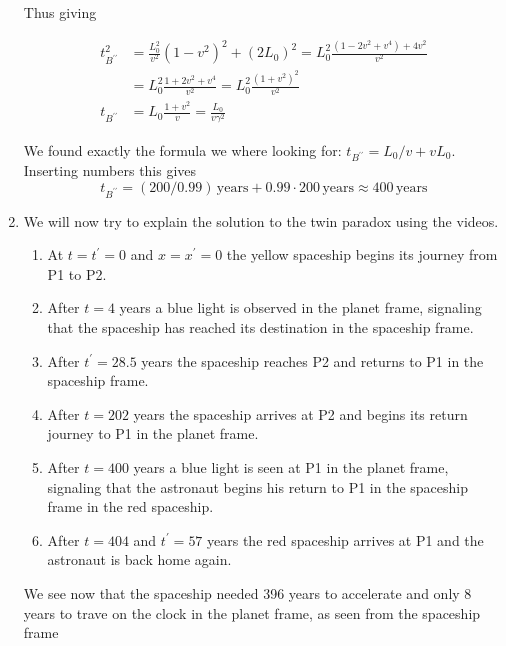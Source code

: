 \documentclass[a4paper,10pt,english]{article}
\begin{document}
\begin{enumerate}
Thus giving 

\begin{align*}
t_{B^{\prime\prime}}^{2}&=\frac{L_{0}^{2}}{v^{2}}(1-v^{2})^{2}+(2L_{0})^{2}=L_{0}^{2}\frac{(1-2v^{2}+v^{4})+4v^{2}}{v^{2}}\\
&=L_{0}^{2}\frac{1+2v^{2}+v^{4}}{v^{2}}=L_{0}^{2}\frac{(1+v^{2})^{2}}{v^{2}}\\
t_{B^{\prime\prime}}&=L_{0}\frac{1+v^{2}}{v}=\frac{L_{0}}{v\gamma^{2}}
\end{align*}

We found exactly the formula we where looking for: $t_{B^{\prime\prime}}=L_{0}/v+vL_{0}$. Inserting numbers this gives \[t_{B^{\prime\prime}}=(200/0.99)\,\text{years}+0.99\cdot200\,\text{years}\approx400\,\text{years}\]
\item We will now try to explain the solution to the twin paradox using the videos.

\begin{enumerate}
\item At $t=t^{\prime}=0$ and $x=x^{\prime}=0$ the yellow spaceship begins its journey from P1 to P2.
\item After $t=4$ years a blue light is observed in the planet frame, signaling that the spaceship has reached its destination in the spaceship frame.
\item After $t^{\prime}=28.5$ years the spaceship reaches P2 and returns to P1 in the spaceship frame.
\item After $t=202$ years the spaceship arrives at P2 and begins its return journey to P1 in the planet frame.
\item After $t=400$ years a blue light is seen at P1 in the planet frame, signaling that the astronaut begins his return to P1 in the spaceship frame in the red spaceship.
\item After $t=404$ and $t^{\prime}=57$ years the red spaceship arrives at P1 and the astronaut is back home again.
\end{enumerate}

We see now that the spaceship needed 396 years to accelerate and only 8 years to trave on the clock in the planet frame, as seen from the spaceship frame
\end{enumerate}
\end{document}

